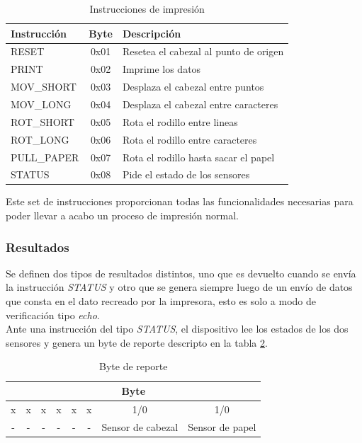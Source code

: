 \begin{table}[ht]
\centering
\begin{tabular}{|l|c|l|} 												\hline
\rowcolor[gray]{.9}
Instrucci\'on & Byte & Descripci\'on 								\\ 	\hline
RESET 		&	0x01	&	Resetea el cabezal	al punto de origen	\\	\hline
PRINT 		&	0x02	&	Imprime los datos						\\	\hline
MOV\_SHORT 	&  	0x03	&	Desplaza el cabezal entre puntos		\\	\hline
MOV\_LONG  	&  	0x04	&	Desplaza el cabezal entre caracteres	\\	\hline
ROT\_SHORT 	&	0x05	&	Rota el rodillo entre lineas			\\	\hline
ROT\_LONG   &	0x06	&	Rota el rodillo entre caracteres		\\	\hline
PULL\_PAPER	&	0x07	&	Rota el rodillo hasta sacar el papel	\\	\hline
STATUS		&	0x08	&	Pide el estado de los sensores			\\	\hline
\end{tabular}
\caption{Instrucciones de impresi\'on} 
\label{tab:instructions_set}
\end{table}

Este set de instrucciones proporcionan todas las funcionalidades necesarias
para poder llevar a acabo un proceso de impresi\'on normal.

\subsubsection{Resultados}
%
Se definen dos tipos de resultados distintos, uno que es devuelto cuando se
env\'ia la instrucci\'on \emph{STATUS} y otro que se genera siempre luego de un
env\'io de datos que consta en el dato recreado por la impresora, esto es solo
a
modo de verificaci\'on tipo \emph{echo}.\\

Ante una instrucci\'on del tipo \emph{STATUS}, el dispositivo lee los estados
de los dos sensores y genera un byte de reporte descripto en la tabla
\ref{tab:report_byte}.


\begin{table}[ht]
\centering
\begin{tabular}{|c|c|c|c|c|c|c|c|}									\hline
\multicolumn{8}{|c|}{Byte}										\\	\hline
x & x & x & x & x & x & 1/0 & 1/0 								\\ 	\hline
- & - & - & - & - & - & Sensor de cabezal & Sensor de papel		\\	\hline
\end{tabular}
\caption{Byte de reporte} 
\label{tab:report_byte}
\end{table}

